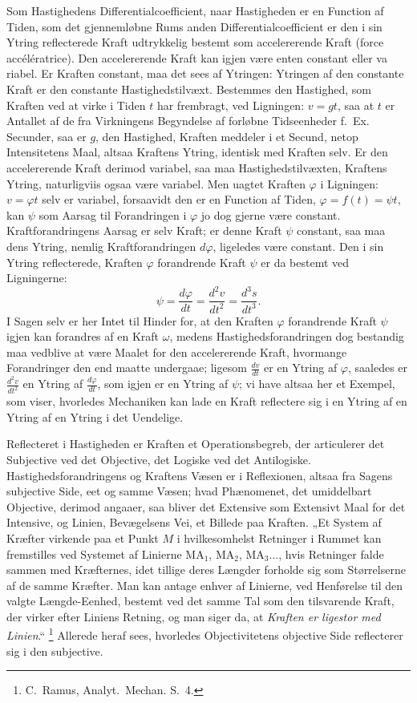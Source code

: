 \documentclass[12pt]{book}
\newcommand{\opage}[1]{\marginnote{\footnotesize\textit{[#1]}}}
\newcommand{\apage}[1]{\marginnote{\footnotesize\textit{[#1]}}}
\begin{document}
Som Hastighedens Differentialcoefficient, naar Hastigheden er en Function af Tiden, som
det gjennemløbne Rums anden Differentialcoefficient er den i sin Ytring reflecterede
Kraft udtrykkelig bestemt som accelererende Kraft (force accélératrice). Den
accelererende Kraft kan igjen være enten constant eller \apage{344} va\-%
riabel. Er Kraften constant, maa det sees af Ytringen: Ytringen af den constante Kraft er
den constante Hastighedstilvæxt. Bestemmes den Hastighed, som Kraften ved at virke i
Tiden $t$ har frembragt, ved Ligningen: $v = gt$, saa at $t$ er Antallet af de fra
Virkningens Begyndelse af forløbne Tidseenheder f.\ Ex. Secunder, saa er $g$, den
Hastighed, Kraften meddeler i et Secund, netop Intensitetens Maal, altsaa Kraftens
Ytring, identisk med Kraften selv. Er den accelererende Kraft derimod variabel, saa maa
Hastighedstilvæxten, Kraftens Ytring, naturligviis ogsaa være variabel. Men uagtet
Kraften $\varphi$ i Ligningen: $v = \varphi t$ selv er variabel, forsaavidt den er en
Function af Tiden, $\varphi = f(t) = \psi t$, kan $\psi$ som Aarsag til Forandringen i
$\varphi$ jo dog gjerne være constant. Kraftforandringens Aarsag er selv Kraft; er denne
Kraft $\psi$ constant, saa maa dens Ytring, nemlig Kraftforandringen $d\varphi$,
ligeledes være constant. Den i sin Ytring reflecterede, Kraften $\varphi$ forandrende
Kraft $\psi$ er da bestemt ved Ligningerne:
\[ \psi = \frac{d\varphi}{dt} = \frac{d^{2}v}{dt^{2}} = \frac{d^{3}s}{dt^{3}}. \]
I Sagen selv er her Intet til Hinder for, at den Kraften $\varphi$ forandrende Kraft
$\psi$ igjen kan forandres af en Kraft $\omega$, medens Hastighedsforandringen dog
bestandig maa vedblive at være Maalet for den accelererende Kraft, hvormange Forandringer
den end maatte undergaae; ligesom $\frac{dv}{dt}$ er en Ytring af $\varphi$, saaledes er
$\frac{d^{2}v}{dt^{2}}$ en Ytring af $\frac{d\varphi}{dt}$, som igjen er en Ytring af
$\psi$; vi have altsaa her et Exempel, som viser, hvorledes Mechaniken kan lade en Kraft
reflectere sig i en Ytring af en Ytring af en Ytring i det Uendelige.

Reflecteret i Hastigheden er Kraften et Operationsbegreb, der articulerer det Subjective
ved det Objective, det Logiske ved det Antilogiske. Hastighedsforandringens og Kraftens
Væsen er i Reflexionen, altsaa fra Sagens subjective Side,
\opage{345} eet og samme Væsen; hvad Phænomenet, det umiddelbart Objective, derimod angaaer, saa
bliver det Extensive som Extensivt Maal for det Intensive, og Linien, Bevægelsens Vei, et
Billede paa Kraften. „Et System af Kræfter virkende paa et Punkt $M$ i hvilkesomhelst
Retninger i Rummet kan fremstilles ved Systemet af Linierne $\mathrm{MA}_{1}$,
$\mathrm{MA}_{2}$, $\mathrm{MA}_{3}\ldots$, hvis Retninger falde sammen med Kræfternes,
idet tillige deres Længder forholde sig som Størrelserne af de samme Kræfter. Man kan
antage enhver af Linierne, ved Henførelse til den valgte Længde-Eenhed, bestemt ved det
samme Tal som den tilsvarende Kraft, der virker efter Liniens Retning, og man siger da,
at \emph{Kraften er ligestor med Linien}.“%
\footnote{C.\ Ramus, Analyt.\ Mechan. S.~4.}
Allerede heraf sees, hvorledes Objectivitetens objective Side reflecterer sig i den
subjective.
\end{document}

